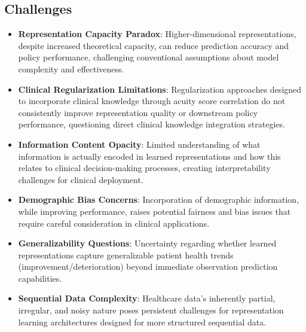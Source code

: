 \subsection*{Challenges}
\begin{itemize}
    \item \textbf{Representation Capacity Paradox}: Higher-dimensional representations, despite increased theoretical capacity, can reduce prediction accuracy and policy performance, challenging conventional assumptions about model complexity and effectiveness.
    \item \textbf{Clinical Regularization Limitations}: Regularization approaches designed to incorporate clinical knowledge through acuity score correlation do not consistently improve representation quality or downstream policy performance, questioning direct clinical knowledge integration strategies.
    \item \textbf{Information Content Opacity}: Limited understanding of what information is actually encoded in learned representations and how this relates to clinical decision-making processes, creating interpretability challenges for clinical deployment.
    \item \textbf{Demographic Bias Concerns}: Incorporation of demographic information, while improving performance, raises potential fairness and bias issues that require careful consideration in clinical applications.
    \item \textbf{Generalizability Questions}: Uncertainty regarding whether learned representations capture generalizable patient health trends (improvement/deterioration) beyond immediate observation prediction capabilities.
    \item \textbf{Sequential Data Complexity}: Healthcare data's inherently partial, irregular, and noisy nature poses persistent challenges for representation learning architectures designed for more structured sequential data.
\end{itemize}

